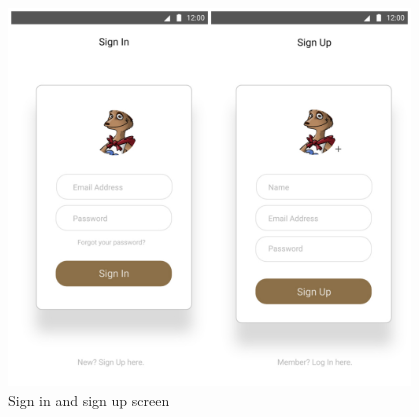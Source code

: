 \documentclass{article}
\begin{document}
\begin{figure}[h]
    \centering
    \includegraphics[width=0.95\textwidth]{signup}
    \caption{Sign in and sign up screen}
    \label{fig:signup1}
\end{figure}
\end{document}
